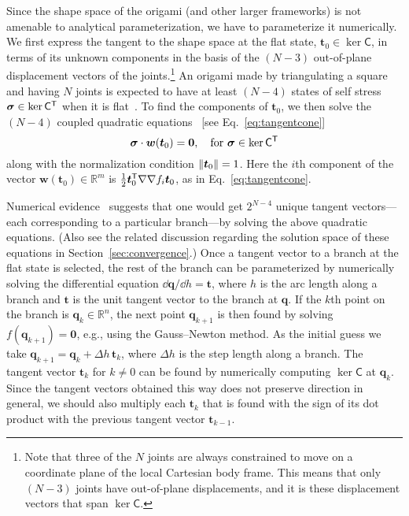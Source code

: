 Since the shape space of the origami (and other larger frameworks) is not amenable to analytical parameterization, we have to parameterize it numerically.
We first express the tangent to the shape space at the flat state, $\bm{t}_{0} \in \ker \mathsf{C}$, in terms of its unknown components in the basis of the $(N - 3)$ out-of-plane displacement vectors of the joints.\footnote{Note that three of the $N$ joints are always constrained to move on a coordinate plane of the local Cartesian body frame.  This means that only $(N - 3)$ joints have out-of-plane displacements, and it is these displacement vectors that span $\ker\mathsf{C}$.}
An origami made by triangulating a square and having $N$ joints is expected to have at least $(N - 4)$ states of self stress $\bm{\sigma} \in \ker\mathsf{C}^\mathsf{T}$ when it is flat~\cite{chen2018}.
To find the components of $\bm{t}_{0}$, we then solve the $(N - 4)$ coupled quadratic equations~\cite{tarnai2001,chen2018} [see Eq.~\eqref{eq:tangentcone}]
%
\begin{equation}
  \bm{\sigma}\cdot\bm{w}(\bm{t}_{0}) = \bm{0},\quad \text{for } \bm{\sigma} \in \ker{\mathsf{C}\ensuremath{^\mathsf{T}}}
  \label{eq:quadratic}
\end{equation}
%
along with the normalization condition $\lVert\bm{t}_{0}\rVert = 1$.
Here the $i$th component of the vector $\bm{w}(\bm{t}_{0}) \in \mathbb{R}^{m}$ is $\tfrac{1}{2}\bm{t}_{0}^\mathsf{T} \nabla\nabla f_{i} \bm{t}_{0}$, as in Eq.~\eqref{eq:tangentcone}. %

Numerical evidence~\cite{chen2018} suggests that one would get $2^{N-4}$ unique tangent vectors---each corresponding to a particular branch---by solving the above quadratic equations.
(Also see the related discussion regarding the solution space of these equations in Section~\ref{sec:convergence}.)
Once a tangent vector to a branch at the flat state is selected, the rest of the branch can be parameterized by numerically solving the differential equation $\dd\bm{q}/\dd{h} = \bm{t}$, where $h$ is the arc length along a branch and $\bm{t}$ is the unit tangent vector to the branch at $\bm{q}$.
If the $k$th point on the branch is $\bm{q}_k \in \mathbb{R}^{n}$, the next point $\bm{q}_{k+1}$ is then found by solving $f(\bm{q}_{k+1}) = \bm{0}$, e.g., using the Gauss--Newton method.
As the initial guess we take $\bm{q}_{k+1} = \bm{q}_{k} + \Delta h\,\bm{t}_{k}$, where $\Delta h$ is the step length along a branch.
The tangent vector $\bm{t}_k$ for $k \ne 0$ can be found by numerically computing $\ker\mathsf{C}$ at $\bm{q}_k$.
Since the tangent vectors obtained this way does not preserve direction in general, we should also multiply each $\bm{t}_k$ that is found with the sign of its dot product with the previous tangent vector $\bm{t}_{k-1}$.

